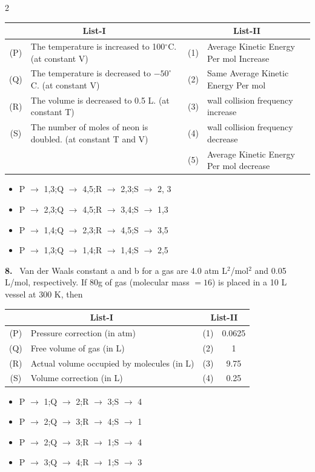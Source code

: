\documentclass[10pt]{extarticle}
\newcommand{\qn}[1]{\par\smallskip\noindent\textbf{#1.}~}
\newenvironment{qoptions}{\begin{itemize}[leftmargin=1.8em,itemsep=1pt,topsep=2pt,label={}]}{\end{itemize}}
\newcommand{\opt}[2]{\item[(#1)] #2}
\begin{document}
\begin{multicols}{2}
\begin{center}
\begin{tabular}{|c|p{3.4cm}|c|p{2.5cm}|}
\hline
\multicolumn{2}{|c|}{List-I} & \multicolumn{2}{c|}{List-II}\\ \hline
(P) & The temperature is increased to 100$^\circ$C. (at constant V) & (1) & Average Kinetic Energy Per mol Increase\\ \hline
(Q) & The temperature is decreased to $-50^\circ$C. (at constant V) & (2) & Same Average Kinetic Energy Per mol\\ \hline
(R) & The volume is decreased to 0.5 L. (at constant T) & (3) & wall collision frequency increase\\ \hline
(S) & The number of moles of neon is doubled. (at constant T and V) & (4) & wall collision frequency decrease\\ \hline
 & & (5) & Average Kinetic Energy Per mol decrease\\ \hline
\end{tabular}
\end{center}
\begin{qoptions}
\opt{A}{P $\to$ 1,3;Q $\to$ 4,5;R $\to$ 2,3;S $\to$ 2, 3}
\opt{B}{P $\to$ 2,3;Q $\to$ 4,5;R $\to$ 3,4;S $\to$ 1,3}
\opt{C}{P $\to$ 1,4;Q $\to$ 2,3;R $\to$ 4,5;S $\to$ 3,5}
\opt{D}{P $\to$ 1,3;Q $\to$ 1,4;R $\to$ 1,4;S $\to$ 2,5}
\end{qoptions}
\qn{8} Van der Waals constant a and b for a gas are 4.0 atm L$^2$/mol$^2$ and 0.05 L/mol, respectively. If 80g of gas (molecular mass $=16$) is placed in a 10 L vessel at 300 K, then
\begin{center}\small\setlength{\tabcolsep}{3pt}
\begin{tabular}{|c|p{3.4cm}|c|c|}
\hline
\multicolumn{2}{|c|}{List-I} & \multicolumn{2}{c|}{List-II}\\ \hline
(P) & Pressure correction (in atm) & (1) & 0.0625\\ \hline
(Q) & Free volume of gas (in L) & (2) & 1\\ \hline
(R) & Actual volume occupied by molecules (in L) & (3) & 9.75\\ \hline
(S) & Volume correction (in L) & (4) & 0.25\\ \hline
\end{tabular}
\end{center}
\begin{qoptions}
\opt{A}{P $\to$ 1;Q $\to$ 2;R $\to$ 3;S $\to$ 4}
\opt{B}{P $\to$ 2;Q $\to$ 3;R $\to$ 4;S $\to$ 1}
\opt{C}{P $\to$ 2;Q $\to$ 3;R $\to$ 1;S $\to$ 4}
\opt{D}{P $\to$ 3;Q $\to$ 4;R $\to$ 1;S $\to$ 3}
\end{qoptions}

\end{multicols}
\end{document}
